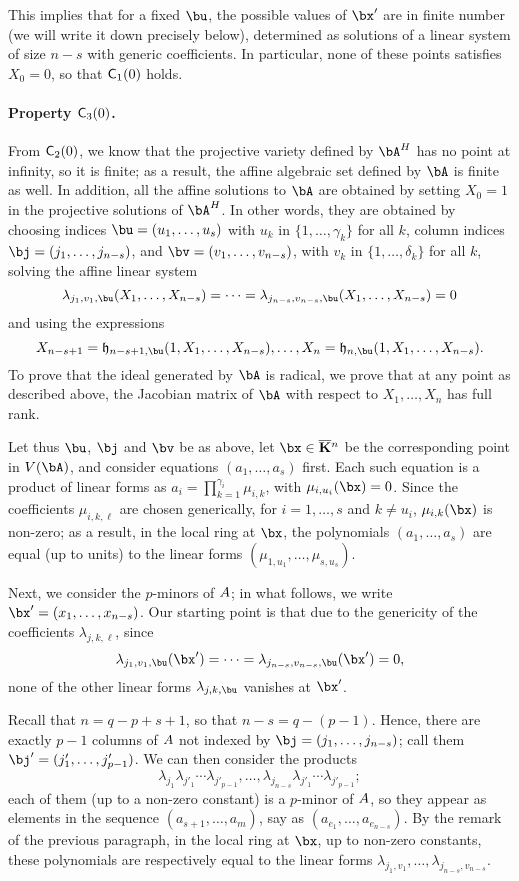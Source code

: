\documentclass[12pt]{article}
\begin{document}
This implies that for a fixed $\bu$, the possible values of $\bx'$ are
in finite number (we will write it down precisely below), determined
as solutions of a linear system of size $n-s$ with generic
coefficients. In particular, none of these points satisfies $X_0=0$,
so that $\mathsf{C}_1(0)$ holds.

\paragraph{Property $\mathsf{C}_3(0)$.} From $\mathsf{C}_2(0)$, we know that
the projective variety defined by $\bA^\mH$ has no point at infinity,
so it is finite; as a result, the affine algebraic set defined by
$\bA$ is finite as well. In addition, all the affine solutions to
$\bA$ are obtained by setting $X_0=1$ in the projective solutions of
$\bA^\mH$. In other words, they are obtained by choosing indices
$\bu=(u_1,\dots,u_s)$ with $u_k$ in $\{1,\dots,\gamma_k\}$ for all $k$,
column indices $\bj=(j_1,\dots,j_{n-s})$, and
$\bv=(v_1,\dots,v_{n-s})$, with $v_k$ in $\{1,\dots,\delta_k\}$
for all $k$, solving the affine linear system
$$\lambda_{j_1,v_1,\bu}(X_1,\dots,X_{n-s})=\cdots=\lambda_{j_{n-s},v_{n-s},\bu}(X_1,\dots,X_{n-s})=0$$ 
and using the expressions
$$X_{n-s+1}=\mathfrak{h}_{n-s+1,\bu}(1,X_1,\dots,X_{n-s}),\dots,X_{n}=\mathfrak{h}_{n,\bu}(1,X_1,\dots,X_{n-s}).$$
To prove that the ideal generated by $\bA$ is radical, we prove that
at any point as described above, the Jacobian matrix of $\bA$ with
respect to $X_1,\dots,X_n$ has full rank.

Let thus $\bu$, $\bj$ and $\bv$ be as above, let $\bx \in \KKbar{}^n$
be the corresponding point in $V(\bA)$, and consider equations
$(a_1,\dots,a_s)$ first. Each such equation is a product of linear forms
as $a_i=\prod_{k=1}^{\gamma_i} \mu_{i,k}$, with $\mu_{i,u_i}(\bx)=0$.
Since the coefficients $\mu_{i,k,\ell}$ are chosen generically, for
$i=1,\dots,s$ and $k \ne u_i$, $\mu_{i,k}(\bx)$ is non-zero; as a
result, in the local ring at $\bx$, the polynomials $(a_1,\dots,a_s)$
are equal (up to units) to the linear forms
$(\mu_{1,u_1},\dots,\mu_{s,u_s})$.

Next, we consider the $p$-minors of ${A}$; in what follows, we 
write $\bx'=(x_1,\dots,x_{n-s})$. Our starting point is that due to 
the genericity of the coefficients $\lambda_{j,k,\ell}$, since 
$$\lambda_{j_1,v_1,\bu}(\bx')=\cdots=\lambda_{j_{n-s},v_{n-s},\bu}(\bx')=0,$$ 
none of the other linear forms $\lambda_{j,k,\bu}$ vanishes at $\bx'$.

Recall that $n=q-p+s+1$, so that $n-s = q-(p-1)$. Hence, there are
exactly $p-1$ columns of ${A}$ not indexed by $\bj=(j_1,\dots,j_{n-s})$; call
them $\bj'=(j'_1,\dots,j'_{p-1})$. We can then consider the 
products
$$ \lambda_{j_1} \lambda_{j'_1} \cdots \lambda_{j'_{p-1}},\dots, \lambda_{j_{n-s}}
\lambda_{j'_1} \cdots \lambda_{j'_{p-1}};$$ each of them (up to a non-zero
constant) is a $p$-minor of ${A}$, so they appear as elements in the
sequence $(a_{s+1},\dots,a_m)$, say as
$(a_{e_1},\dots,a_{e_{n-s}})$. By the remark of the previous
paragraph, in the local ring at $\bx$, up to non-zero constants, these
polynomials are respectively equal to the linear forms
$\lambda_{j_1,v_1},\dots,\lambda_{j_{n-s},v_{n-s}}$.  
\end{document}
